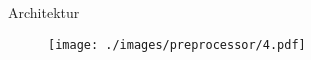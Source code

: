 \begin{frame}{Architektur}
    \begin{figure}
    	\centering
    	\texttt{[image: ./images/preprocessor/4.pdf]}
    \end{figure}
\end{frame}
